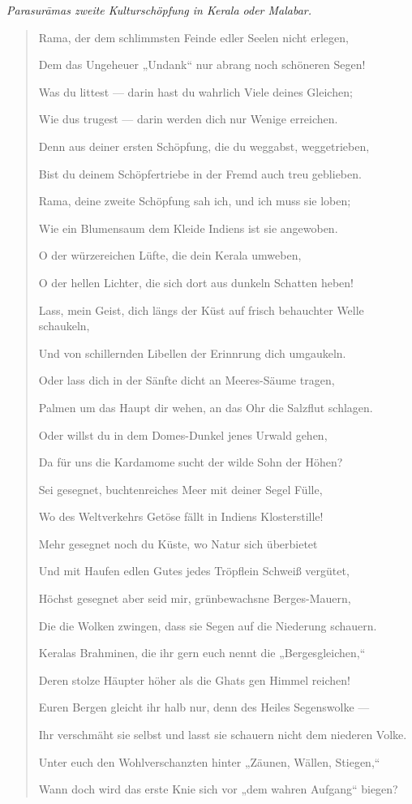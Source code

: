 \documentclass{article}
\begin{document}
\begin{center}
\end{center}
\begin{center}
\emph{Parasur\={a}mas zweite Kulturschöpfung in Kerala oder Malabar.}
\end{center}
\begin{quotation}\small
Rama, der dem schlimmsten Feinde edler Seelen nicht erlegen,

Dem das Ungeheuer „Undank“ nur abrang noch schöneren Segen!

Was du littest — darin hast du wahrlich Viele deines Gleichen;

Wie dus trugest — darin werden dich nur Wenige erreichen.

Denn aus deiner ersten Schöpfung, die du weggabst, weggetrieben,

Bist du deinem Schöpfertriebe in der Fremd auch treu geblieben.

Rama, deine zweite Schöpfung sah ich, und ich muss sie loben;

Wie ein Blumensaum dem Kleide Indiens ist sie angewoben.

O der würzereichen Lüfte, die dein Kerala umweben,

O der hellen Lichter, die sich dort aus dunkeln Schatten heben!

Lass, mein Geist, dich längs der Küst auf frisch behauchter Welle schaukeln,

Und von schillernden Libellen der Erinnrung dich umgaukeln.

Oder lass dich in der Sänfte dicht an Meeres-Säume tragen,

Palmen um das Haupt dir wehen, an das Ohr die Salzflut schlagen.

Oder willst du in dem Domes-Dunkel jenes Urwald gehen,

Da für uns die Kardamome sucht der wilde Sohn der Höhen?

Sei gesegnet, buchtenreiches Meer mit deiner Segel Fülle,

Wo des Weltverkehrs Getöse fällt in Indiens Klosterstille!

Mehr gesegnet noch du Küste, wo Natur sich überbietet

Und mit Haufen edlen Gutes jedes Tröpflein Schweiß vergütet,

Höchst gesegnet aber seid mir, grünbewachsne Berges-Mauern,

Die die Wolken zwingen, dass sie Segen auf die Niederung schauern.

Keralas Brahminen, die ihr gern euch nennt die „Bergesgleichen,“

Deren stolze Häupter höher als die Ghats gen Himmel reichen!

Euren Bergen gleicht ihr halb nur, denn des Heiles Segenswolke —

Ihr verschmäht sie selbst und lasst sie schauern nicht dem niederen Volke.

Unter euch den Wohlverschanzten hinter „Zäunen, Wällen, Stiegen,“

Wann doch wird das erste Knie sich vor „dem wahren Aufgang“ biegen?
\end{quotation}
\end{document}
